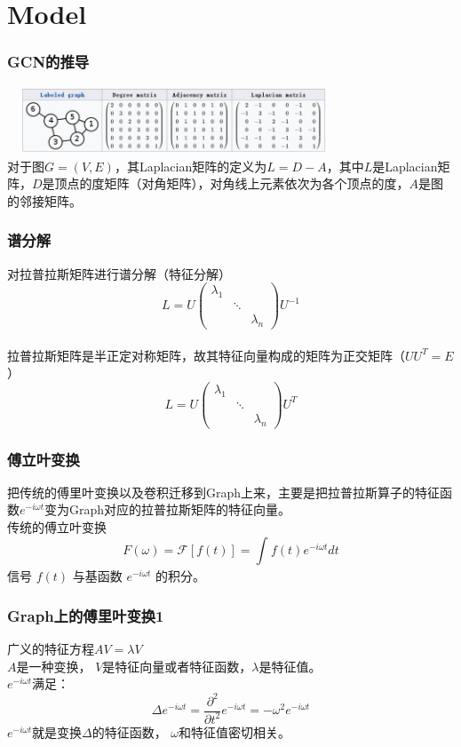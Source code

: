 \documentclass{beamer}
\begin{document}
\section{Model}
\begin{frame}
    \frametitle{GCN的推导}
    \includegraphics[height=2cm, width=10cm]{images/laplacian.jpg}\\
    对于图$G=(V, E)$，其Laplacian矩阵的定义为$L=D-A$，其中$L$是Laplacian矩阵，$D$是顶点的度矩阵（对角矩阵），对角线上元素依次为各个顶点的度，$A$是图的邻接矩阵。

\end{frame}

\begin{frame}
    \frametitle{谱分解}
    对拉普拉斯矩阵进行谱分解（特征分解）\\
    $$L= U\left(\begin{matrix}\lambda_1 & \\&\ddots \\ &&\lambda_n \end{matrix}\right) U^{-1}$$\\
    拉普拉斯矩阵是半正定对称矩阵，故其特征向量构成的矩阵为正交矩阵（$UU^{T}=E$）\\
    $$L= U\left(\begin{matrix}\lambda_1 & \\&\ddots \\ &&\lambda_n \end{matrix}\right) U^{T}$$

\end{frame}

\begin{frame}
    \frametitle{傅立叶变换}
    把传统的傅里叶变换以及卷积迁移到Graph上来，主要是把拉普拉斯算子的特征函数$e^{-i\omega t}$变为Graph对应的拉普拉斯矩阵的特征向量。\\
    传统的傅立叶变换
    $$F(\omega)=\mathcal{F}[f(t)]=\int_{}^{}f(t)e^{-i\omega t} dt$$
    信号 $f(t)$ 与基函数 $e^{-i\omega t}$ 的积分。\\
\end{frame}

\begin{frame}
    \frametitle{Graph上的傅里叶变换1}
    广义的特征方程$AV=\lambda V$\\
    $A$是一种变换， $V$是特征向量或者特征函数，$\lambda$是特征值。\\
    $e^{-i\omega t}$满足：
    $$\Delta e^{-i\omega t}=\frac{\partial^{2}}{\partial t^{2}} e^{-i\omega t}=-\omega^{2} e^{-i\omega t}$$
    $e^{-i\omega t}$就是变换$\Delta$的特征函数， $\omega$和特征值密切相关。
\end{frame}
\end{document}
